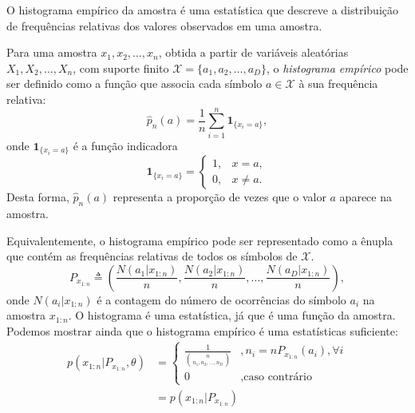 O histograma empírico da amostra é uma estatística que descreve a distribuição de frequências relativas dos valores observados em uma amostra. 
\begin{definition}
  Para uma amostra $x_1,x_2,\ldots,x_n$, obtida a partir de variáveis aleatórias $X_1,X_2,\ldots,X_n$,
  com suporte finito $\mathcal{X} = \{a_1,a_2,\ldots,a_D\}$, o \emph{histograma empírico}
  pode ser definido como a
  função que associa cada símbolo $a \in \mathcal{X}$ à sua frequência relativa:
  \begin{equation}
    \hat{p}_n(a) = \frac{1}{n} \sum_{i=1}^n \mathbf{1}_{\{ x_i = a \}} ,
  \end{equation}
  onde $\mathbf{1}_{\{ x_i = a \}}$ é a função indicadora
  \begin{equation}
    \mathbf{1}_{\{ x_i = a \}} = \begin{cases}
      1, & x = a,\\
      0, & x\neq a. 
    \end{cases}
  \end{equation}
  Desta forma, $\hat{p}_n(a)$ representa a proporção de vezes que o valor $a$ aparece na amostra.
\end{definition}
Equivalentemente, o histograma empírico pode ser representado como a ênupla que contém as frequências relativas de todos os símbolos de $\mathcal{X}$.
\begin{equation}
P_{x_{1:n}} \triangleq \left( \frac{N(a_1|x_{1:n})}{n} , \frac{N(a_2|x_{1:n})}{n} , \ldots , \frac{N(a_D|x_{1:n})}{n} \right) ,
\end{equation}
onde $N(a_i|x_{1:n})$ é a contagem do número de ocorrências do símbolo $a_i$ na amostra $x_{1:n}$.
O histograma é uma estatística, já que é uma função da amostra. Podemos mostrar ainda que
o histograma empírico é uma estatísticas suficiente:
\begin{subequations}
  \begin{align}
    p(x_{1:n}|P_{x_{1:n}},\theta) &=
                \begin{cases}
                \frac{1}{{n \choose {n_1, n_2, \ldots, n_D}}} & , n_i = n P_{x_{1:n}}(a_i), \forall i \\
                0       & , \text{caso contrário}
                \end{cases} \\
                &= p(x_{1:n} \vert P_{x_{1:n}})
  \end{align}
\end{subequations}
